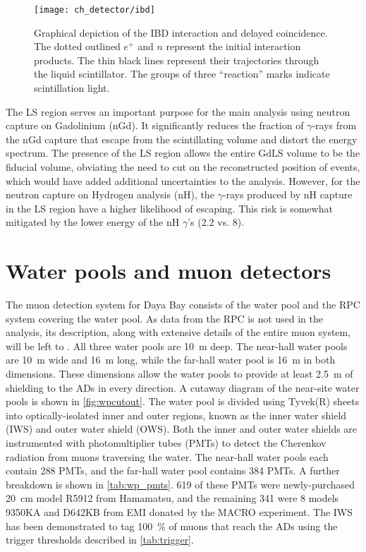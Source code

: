 \begin{figure}
    \centering
    \texttt{[image: ch\_detector/ibd]}
    \caption{
        Graphical depiction of the IBD interaction and delayed coincidence.
        The dotted outlined $e^+$ and $n$ represent the initial interaction products.
        The thin black lines represent their trajectories
        through the liquid scintillator.
        The groups of three ``reaction'' marks indicate scintillation light.
    }
    \label{fig:ibd_cartoon}
\end{figure}

The LS region serves an important purpose for the main \thetaot{}
analysis using neutron capture on Gadolinium (nGd).
It significantly reduces the fraction of $\gamma$-rays from the nGd capture
that escape from the scintillating volume and distort the energy spectrum.
The presence of the LS region allows the entire GdLS volume to be
the fiducial volume, obviating the need to cut on the reconstructed position
of events, which would have added additional uncertainties to the analysis.
However, for the neutron capture on Hydrogen analysis (nH),
the $\gamma$-rays produced by nH capture in the LS region
have a higher likelihood of escaping.
This risk is somewhat mitigated by the lower energy of the nH $\gamma$'s
(\SI{2.2}{\mev} vs. \SI{8}{\mev}).


\section{Water pools and muon detectors}
\label{sec:wp}

The muon detection system for Daya Bay consists of
the water pool and the RPC system covering the water pool.
As data from the RPC is not used in the \thetaot{} analysis,
its description, along with extensive details of the entire muon system,
will be left to \cite{muonsystem2015}.
All three water pools are \SI{10}{\m} deep.
The near-hall water pools are \SI{10}{\m} wide and \SI{16}{\m} long,
while the far-hall water pool is \SI{16}{\m} in both dimensions.
These dimensions allow the water pools to provide at least \SI{2.5}{\m} of shielding
to the ADs in every direction.
A cutaway diagram of the near-site water pools is shown in \cref{fig:wpcutout}.
The water pool is divided using Tyvek(R) sheets
into optically-isolated inner and outer regions,
known as the inner water shield (IWS) and outer water shield (OWS).
Both the inner and outer water shields are instrumented with photomultiplier tubes (PMTs)
to detect the Cherenkov radiation from muons traversing the water.
The near-hall water pools each contain \num{288} PMTs,
and the far-hall water pool contains \num{384} PMTs.
A further breakdown is shown in \cref{tab:wp_pmts}.
\num{619} of these PMTs were newly-purchased \SI{20}{\cm}
model R5912 from Hamamatsu,
and the remaining \num{341} were \SI{8}{\inch} models 9350KA
and D642KB from EMI
donated by the MACRO experiment.
The IWS has been demonstrated to tag \SI{100}{\percent} of muons
that reach the ADs using the trigger thresholds described in \cref{tab:trigger}.



